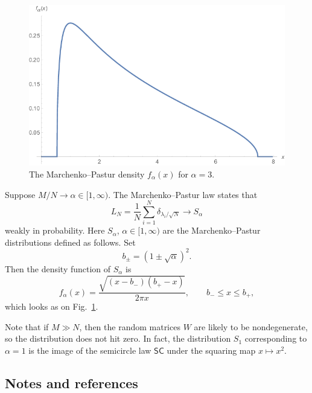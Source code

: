 \documentclass[letterpaper,11pt,oneside,reqno]{amsart}
\numberwithin{equation}{section}
\newcommand{\SC}{\mathsf{SC}}
\theoremstyle{definition}
\begin{document}
\begin{figure}[htbp]
	\includegraphics[width=.8\textwidth]{img/Marchenko-Pastur.png}
	\caption{The Marchenko--Pastur density $f_\alpha(x)$ for $\alpha=3$.}
	\label{fig:MP_law}
\end{figure}

Suppose $ M / N \to \alpha \in [ 1, \infty ) $. The Marchenko--Pastur law states that
\begin{equation*}
L_N = \frac{ 1 }{ N } \sum_{ i = 1 }^N \delta_{ \lambda_i / \sqrt{N} } \to S_\alpha 
\end{equation*}
weakly in probability. Here
$ S_\alpha $, $\alpha\in[1,\infty)$ are the Marchenko--Pastur distributions defined as follows.
Set
\begin{equation*}
b_\pm = ( 1 \pm \sqrt{\alpha} )^2.
\end{equation*}
Then the density function of $ S_\alpha $ is
\begin{equation*}
f_\alpha( x ) = \frac{ \sqrt{ ( x - b_- ) ( b_+ - x ) } }{ 2 \pi x }, \qquad b_- \le x \le b_+,
\end{equation*}
which looks as on Fig.~\ref{fig:MP_law}.

Note that if $ M \gg N $, then the random matrices $W$ are likely to be nondegenerate, so the distribution does not hit zero.
In fact, the distribution $ S_1 $ corresponding to $\alpha=1$
is the image of the semicircle law $ \SC $ under the squaring map $ x \mapsto x^2 $.



\subsection{Notes and references} %
\label{sub:notes_WSCL}
\end{document}
